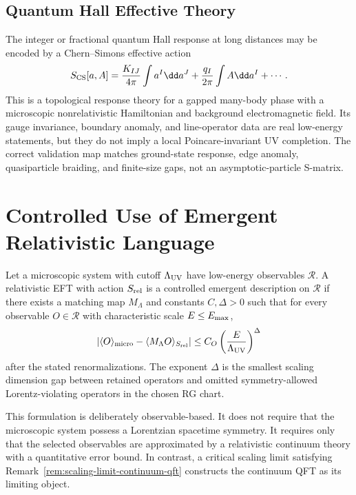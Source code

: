 \subsection{Quantum Hall Effective Theory}

The integer or fractional quantum Hall response at long distances may be
encoded by a Chern--Simons effective action
\[
  S_{\rm CS}[a,A]
  =
  \frac{K_{IJ}}{4\pi}\int a^I\dd a^J
  +\frac{q_I}{2\pi}\int A\dd a^I+\cdots .
\]
This is a topological response theory for a gapped many-body phase with a
microscopic nonrelativistic Hamiltonian and background electromagnetic field.
Its gauge invariance, boundary anomaly, and line-operator data are real
low-energy statements, but they do not imply a local Poincare-invariant UV
completion.  The correct validation map matches ground-state response,
edge anomaly, quasiparticle braiding, and finite-size gaps, not an
asymptotic-particle S-matrix.

\section{Controlled Use of Emergent Relativistic Language}

\begin{controlledapproximation}
\label{ca:emergent-relativistic-eft}
Let a microscopic system with cutoff \(\Lambda_{\rm UV}\) have low-energy
observables \(\mathcal R\).  A relativistic EFT with action \(S_{\rm rel}\)
is a controlled emergent description on \(\mathcal R\) if there exists a
matching map \(M_\Lambda\) and constants \(C,\Delta>0\) such that for every
observable \(O\in\mathcal R\) with characteristic scale \(E\le E_{\rm max}\),
\[
  \left|
    \langle O\rangle_{\rm micro}
    -
    \langle M_\Lambda O\rangle_{S_{\rm rel}}
  \right|
  \le
  C_O\left(\frac{E}{\Lambda_{\rm UV}}\right)^{\Delta}
\]
after the stated renormalizations.  The exponent \(\Delta\) is the smallest
scaling dimension gap between retained operators and omitted symmetry-allowed
Lorentz-violating operators in the chosen RG chart.
\end{controlledapproximation}

This formulation is deliberately observable-based.  It does not require that
the microscopic system possess a Lorentzian spacetime symmetry.  It requires
only that the selected observables are approximated by a relativistic
continuum theory with a quantitative error bound.  In contrast, a critical
scaling limit satisfying Remark~\ref{rem:scaling-limit-continuum-qft}
constructs the continuum QFT as its limiting object.

